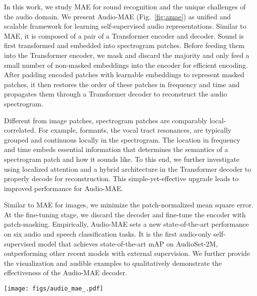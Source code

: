 \documentclass{article}
\begin{document}
In this work, we study MAE for sound recognition and the unique challenges of the audio domain.
We present Audio-MAE (Fig.~\ref{fig:amae}) as unified and scalable framework for learning self-supervised audio representations.
Similar to MAE, it is composed of a pair of a Transformer encoder and decoder.
Sound is first transformed and embedded into spectrogram patches.
Before feeding them into the Transformer encoder, we mask and discard the majority and only feed a small number of non-masked embeddings into the encoder for efficient encoding.
After padding encoded patches with learnable embeddings to represent masked patches, it then restores the order of these patches in frequency and time and propagates them through a Transformer decoder to reconstruct the audio spectrogram. 

Different from image patches, spectrogram patches are comparably local-correlated.
For example, formants, the vocal tract resonances, are typically grouped and continuous locally in the spectrogram.
The location in frequency and time embeds essential information that determines the semantics of a spectrogram patch and how it sounds like.
To this end, we further investigate using localized attention and a hybrid architecture in the Transformer decoder to properly decode for reconstruction.
This simple-yet-effective upgrade leads to improved performance for Audio-MAE.

Similar to MAE for images, we minimize the patch-normalized mean square error.
At the fine-tuning stage, we discard the decoder and fine-tune the encoder with patch-masking.
Empirically, Audio-MAE sets a new state-of-the-art performance on six audio and speech classification tasks. 
It is the first audio-only self-supervised model that achieves state-of-the-art mAP on AudioSet-2M, outperforming other recent models with external supervision.
We further provide the visualization and audible examples to qualitatively demonstrate the effectiveness of the Audio-MAE decoder.





\begin{figure*}[t]
\centering
    \texttt{[image: figs/audio\_mae\_.pdf]}
    \caption{\textbf{Audio-MAE for audio self-supervised learning}. An audio recording is first transformed into a spectrogram and split into patches. 
    We embed patches and mask out a large subset (80\%).
    An encoder then operates on the visible (20\%) patch embeddings.
    Finally, a decoder processes the order-restored embeddings and mask tokens to reconstruct the input.
    Audio-MAE is minimizing the mean square error (MSE) on the masked portion of the reconstruction and the input spectrogram.
    }
    \vspace{-1em}
    \label{fig:amae}
\end{figure*}
\end{document}
